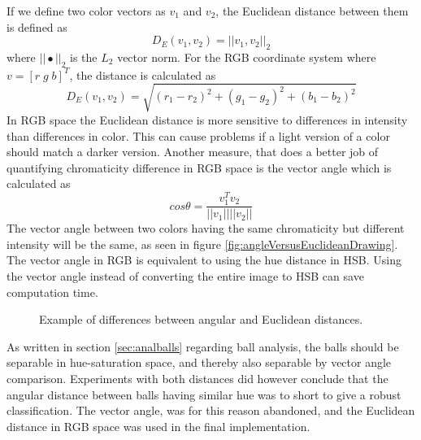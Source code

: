 If we define two color vectors as $v_{1}$ and $v_{2}$, the Euclidean distance between them is defined as
\begin{equation}
D_{E}(v_{1}, v_{2}) = ||v_{1}, v_{2}||_{2}
\end{equation}
where $||\bullet||_{2}$ is the $L_{2}$ vector norm. For the RGB coordinate system where $v = [r\;g\;b]^{T}$, the distance is calculated as
\begin{equation}
D_{E}(v_{1}, v_{2}) = \sqrt{(r_{1} - r_{2})^{2} + (g_{1} - g_{2})^{2} + (b_{1} - b_{2})^{2}}
\end{equation}
In RGB space the Euclidean distance is more sensitive to differences in intensity than differences in color. This can cause problems if a light version of a color should match a darker version. Another measure, that does a better job of quantifying chromaticity difference in RGB space is the vector angle which is calculated as
\begin{equation}
cos \theta = \frac{v_{1}^ Tv_{2}}{||v_{1}|| ||v_{2}||}
\end{equation}
The vector angle between two colors having the same chromaticity but different intensity will be the same, as seen in figure \ref{fig:angleVersusEuclideanDrawing}. The vector angle in RGB is equivalent to using the hue distance in HSB. Using the vector angle instead of converting the entire image to HSB can save computation time.\cite{angleVsEuclidean}
\begin{figure}[H]
  \centering
  \quad           
\caption{Example of differences between angular and Euclidean distances.}
\label{fig:angleVersusEuclidean}
\end{figure}
As written in section \ref{sec:analballs} regarding ball analysis, the balls should be separable in hue-saturation space, and thereby also separable by vector angle comparison. Experiments with both distances did however conclude that the angular distance between balls having similar hue was to short to give a robust classification. The vector angle, was for this reason abandoned, and the Euclidean distance in RGB space was used in the final implementation.

